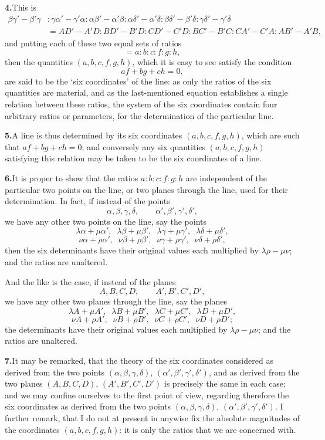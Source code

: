 \documentclass[11pt,a4paper]{article}
\begin{document}
\textbf{4.}\quad This is
\begin{align*}
\beta\gamma' - \beta'\gamma &: \gamma\alpha' - \gamma'\alpha
   : \alpha\beta' - \alpha'\beta : \alpha\delta' - \alpha'\delta
   : \beta\delta' - \beta'\delta : \gamma\delta' - \gamma'\delta \\
&= AD' - A'D : BD' - B'D : CD' - C'D : BC' - B'C : CA' - C'A : AB' - A'B,
\end{align*}
and putting each of these two equal sets of ratios
\[
= a : b : c : f : g : h,
\]
then the quantities $(a, b, c, f, g, h)$, which it is easy to see satisfy the
condition
\[
af + bg + ch = 0,
\]
are said to be the `six coordinates' of the line: as only the ratios of the six
quantities are material, and as the last-mentioned equation establishes a
single relation between these ratios, the system of the six coordinates contain
four arbitrary ratios or parameters, for the determination of the particular
line.

\textbf{5.}\quad A line is thus determined by its six coordinates
$(a, b, c, f, g, h)$, which are such that $af + bg + ch = 0$; and conversely
any six quantities $(a, b, c, f, g, h)$ satisfying this relation may be taken
to be the six coordinates of a line.

\textbf{6.}\quad It is proper to show that the ratios $a : b : c : f : g : h$
are independent of the particular two points on the line, or two planes
through the line, used for their determination. In fact, if instead of the
points
\[
\alpha, \beta, \gamma, \delta, \qquad \alpha', \beta', \gamma', \delta',
\]
we have any other two points on the line, say the points
\[
\lambda\alpha + \mu\alpha',\;\; \lambda\beta + \mu\beta',\;\;
\lambda\gamma + \mu\gamma',\;\; \lambda\delta + \mu\delta',
\]
\[
\nu\alpha + \rho\alpha',\;\; \nu\beta + \rho\beta',\;\;
\nu\gamma + \rho\gamma',\;\; \nu\delta + \rho\delta',
\]
then the six determinants have their original values each multiplied by
$\lambda\rho - \mu\nu$; and the ratios are unaltered.

And the like is the case, if instead of the planes
\[
A, B, C, D, \qquad A', B', C', D',
\]
we have any other two planes through the line, say the planes
\[
\lambda A + \mu A',\;\; \lambda B + \mu B',\;\;
\lambda C + \mu C',\;\; \lambda D + \mu D',
\]
\[
\nu A + \rho A',\;\; \nu B + \rho B',\;\;
\nu C + \rho C',\;\; \nu D + \rho D';
\]
the determinants have their original values each multiplied by
$\lambda\rho - \mu\nu$; and the ratios are unaltered.

\textbf{7.}\quad It may be remarked, that the theory of the six coordinates
considered as derived from the two points
$(\alpha, \beta, \gamma, \delta)$, $(\alpha', \beta', \gamma', \delta')$, and
as derived from the two planes $(A, B, C, D)$, $(A', B', C', D')$ is precisely
the same in each case; and we may confine ourselves to the first point of
view, regarding therefore the six coordinates as derived from the two points
$(\alpha, \beta, \gamma, \delta)$, $(\alpha', \beta', \gamma', \delta')$. I
further remark, that I do not at present in anywise fix the absolute
magnitudes of the coordinates $(a, b, c, f, g, h)$: it is only the ratios that
we are concerned with.
\end{document}
